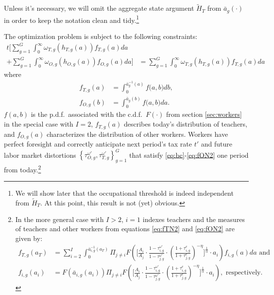 \documentclass[onehalfspacing,11pt]{article}
\begin{document}
	Unless it's necessary, we will omit the aggregate state argument $\widetilde{H}_T$ from $\bar{a}_g(\cdot)$ in order to keep the notation clean and tidy.\footnote{We will show later that the occupational threshold is indeed independent from $\widetilde{H}_T$. At this point, this result is not (yet) obvious.}
	
	The optimization problem is subject to the following constraints:
	\begin{align}
		t\Bigg[ \sum_{g=1}^G \int_0^\infty \omega_{T,g}\left(h_{T,g}(a)\right) f_{T,g}(a) da & \nonumber\\
		+  \sum_{g=1}^G \int_0^\infty \omega_{O,g}\left(h_{O,g}(a)\right) f_{O,g}(a) da \Bigg] & =  \sum_{g=1}^G\int_0^\infty \omega_{T,g}\left(h_{T,g}(a)\right) f_{T,g}(a) da \label{eq:bc}%
	\end{align}
	where
	\begin{align}
		f_{T,g}(a) & = \int_0^{\bar{a}_g^{-1}\left(a\right)} f\big(a,b \big) db, \label{eq:fTN2} \\
		f_{O,g}(b) & = \int_0^{\bar{a}_g\left(b\right)} f\big(a,b \big) da. \label{eq:fON2}
	\end{align}
	$f(a,b)$ is the p.d.f.~associated with the c.d.f.~$F(\cdot)$ from section \ref{sec:workers} in the special case with $I=2$, $f_{T,g}(a)$ describes today's distribution of teachers, and $f_{O,g}(a)$ characterizes the distribution of other workers. Workers have perfect foresight and correctly anticipate next period's tax rate $t'$ and future labor market distortions $\left\{ \tau^{\omega '}_{O,g}, \tau^{\omega '}_{T,g} \right\}_{g =1}^G$ that satisfy \eqref{eq:bc}-\eqref{eq:fON2} one period from today.\footnote{In the more general case with $I>2$, $i=1$ indexes teachers and the measures of teachers and other workers from equations \eqref{eq:fTN2} and \eqref{eq:fON2} are given by:
		\begin{align}
			f_{T,g}(a_T) & = \sum_{i=2}^I \int_0^{\bar{a}_{i,g}^{-1}\left(a_T\right)} \Pi_{j\neq i} F\left(\Bigg[\frac{A_i}{A_j}\cdot\frac{1-\tau^{\omega'}_{i,g}}{1-\tau^{\omega '}_{j,g}} \cdot \left(\frac{1+\tau^e_{i,g}}{1+\tau^e_{j,g}} \right)^{-\eta}\Bigg]^\frac{1}{\alpha}\cdot a_i\right)f_{i,g}(a)da \textrm{ and}\\
			f_{i,g}(a_i) & = F(\bar{a}_{i,g}(a_i)) \Pi_{j\neq i} F\left(\Bigg[\frac{A_i}{A_j}\cdot\frac{1-\tau^{\omega '}_{i,g}}{1-\tau^{\omega '}_{j,g}} \cdot \left(\frac{1+\tau^e_{i,g}}{1+\tau^e_{j,g}} \right)^{-\eta}\Bigg]^\frac{1}{\alpha} \cdot a_i\right), \textrm{ respectively.}
		\end{align}
	}
	
\end{document}
